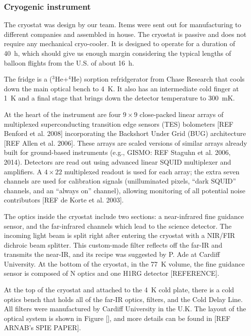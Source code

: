 \subsubsection{Cryogenic instrument}

The cryostat was design by our team. Items were sent out for manufacturing to different companies and assembled in house. The cryostat is passive and does not require any mechanical cryo-cooler. It is designed to operate for a duration of \SI{40}{\hour}, which should give us enough margin considering the typical lengths of balloon flights from the U.S. of about \SI{16}{\hour}. 

The fridge is a ($^3$He+$^4$He) sorption refridgerator from Chase Research that cools down the main optical bench to \SI{4}{\kelvin}. It also has an intermediate cold finger at \SI{1}{\kelvin} and a final stage that brings down the detector temperature to \SI{300}{\milli\kelvin}. 

At the heart of the instrument are four $9\times 9$ close-packed linear arrays of multiplexed superconducting transition edge sensors (TES) bolometers [REF Benford et al. 2008] incorporating the Backshort Under Grid (BUG) architecture [REF Allen et al. 2006]. These arrays are scaled versions of similar arrays already built for ground-based instruments (e.g., GISMO: REF Staguhn et al. 2006, 2014). Detectors are read out using advanced linear SQUID multiplexer and amplifiers. A $4\times 22$ multiplexed readout is used for each array; the extra seven channels are used for calibration signals (unilluminated pixels, “dark SQUID” channels, and an “always on” channel), allowing monitoring of all potential noise contributors [REF de Korte et al. 2003].  

The optics inside the cryostat include two sections: a near-infrared fine guidance sensor, and the far-infrared channels which lead to the science detector. The incoming light beam is split right after entering the cryostat with a NIR/FIR dichroic beam splitter. This custom-made filter reflects off the far-IR and transmits the near-IR, and its recipe was suggested by P. Ade at Cardiff University. At the bottom of the cryostat, in the \SI{77}{\kelvin} volume, the fine guidance sensor is composed of N optics and one H1RG detector [REFERENCE]. 

At the top of the cryostat and attached to the \SI{4}{\kelvin} cold plate, there is a cold optics bench that holds all of the far-IR optics, filters, and the Cold Delay Line. All filters were manufactured by Cardiff University in the U.K. The layout of the optical system is shown in Figure [], and more details can be found in [REF ARNAB's SPIE PAPER].



